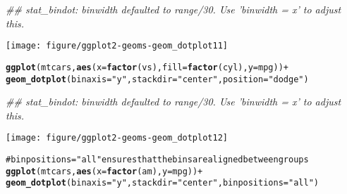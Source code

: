 \documentclass[a4paper,titlepage]{tufte-handout}\usepackage{graphicx, color}
\makeatletter
\def\maxwidth{ %
  \ifdim\Gin@nat@width>\linewidth
    \linewidth
  \else
    \Gin@nat@width
  \fi
}
\newcommand{\hlfunctioncall}[1]{\textcolor[rgb]{0.501960784313725,0,0.329411764705882}{\textbf{#1}}}%
\newcommand{\hlstring}[1]{\textcolor[rgb]{0.6,0.6,1}{#1}}%
\newenvironment{kframe}{%
 \def\at@end@of@kframe{}%
 \ifinner\ifhmode%
  \def\at@end@of@kframe{\end{minipage}}%
  \begin{minipage}{\columnwidth}%
 \fi\fi%
 \def\FrameCommand##1{\hskip\@totalleftmargin \hskip-\fboxsep
 \colorbox{shadecolor}{##1}\hskip-\fboxsep
     \hskip-\linewidth \hskip-\@totalleftmargin \hskip\columnwidth}%
 \MakeFramed {\advance\hsize-\width
   \@totalleftmargin\z@ \linewidth\hsize
   \@setminipage}}%
 {\par\unskip\endMakeFramed%
 \at@end@of@kframe}
\newenvironment{knitrout}{}{} %
\makeatother
\begin{document}
\begin{knitrout}
\begin{kframe}
{\ttfamily\noindent\itshape\textcolor{messagecolor}{\#\# stat\_bindot: binwidth defaulted to range/30. Use 'binwidth = x' to adjust this.}}\end{kframe}\texttt{[image: figure/ggplot2-geoms-geom\_dotplot11]} \begin{kframe}\begin{alltt}
\hlfunctioncall{ggplot}(mtcars, \hlfunctioncall{aes}(x = \hlfunctioncall{factor}(vs), fill = \hlfunctioncall{factor}(cyl), y = mpg)) +
  \hlfunctioncall{geom_dotplot}(binaxis = \hlstring{"y"}, stackdir = \hlstring{"center"}, position = \hlstring{"dodge"})
\end{alltt}


{\ttfamily\noindent\itshape\textcolor{messagecolor}{\#\# stat\_bindot: binwidth defaulted to range/30. Use 'binwidth = x' to adjust this.}}\end{kframe}\texttt{[image: figure/ggplot2-geoms-geom\_dotplot12]} \begin{kframe}\begin{alltt}
# binpositions=\hlstring{"all"} ensures that the bins are aligned between groups
\hlfunctioncall{ggplot}(mtcars, \hlfunctioncall{aes}(x = \hlfunctioncall{factor}(am), y = mpg)) +
  \hlfunctioncall{geom_dotplot}(binaxis = \hlstring{"y"}, stackdir = \hlstring{"center"}, binpositions=\hlstring{"all"})
\end{alltt}



\end{kframe}
\end{knitrout}
\end{document}
